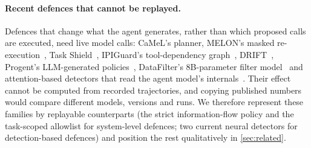 \documentclass[preprint,12pt,nonatbib]{elsarticle}
\theoremstyle{remark}
\begin{document}
\paragraph{Recent defences that cannot be replayed.} Defences that change what the
agent generates, rather than which proposed calls are executed, need live model
calls: CaMeL's planner, MELON's masked re-execution~\citep{zhu2025melon}, Task
Shield~\citep{jia2025taskshield}, IPIGuard's tool-dependency graph~\citep{an2025ipiguard},
DRIFT~\citep{li2025drift}, Progent's LLM-generated policies~\citep{shi2025progent},
DataFilter's 8B-parameter filter model~\citep{wang2026datafilter} and attention-based
detectors that read the agent model's internals~\citep{hung2025attentiontracker,zhong2026attention}.
Their effect cannot be computed from recorded trajectories, and copying published
numbers would compare different models, versions and runs. We therefore represent
these families by replayable counterparts (the strict information-flow policy and
the task-scoped allowlist for system-level defences; two current neural detectors
for detection-based defences) and position the rest qualitatively in
\cref{sec:related}.
\end{document}
